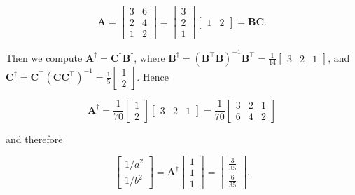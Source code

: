 \[
	\boldsymbol{A}=\left[\begin{array}{ll}
		3 & 6 \\
		2 & 4 \\
		1 & 2
	\end{array}\right]=\left[\begin{array}{l}
		3 \\
		2 \\
		1
	\end{array}\right]\left[\begin{array}{ll}
		1 & 2
	\end{array}\right]=\boldsymbol{B} \boldsymbol{C} .
\]

Then we compute \(\boldsymbol{A}^{\dagger}=\boldsymbol{C}^{\dagger} \boldsymbol{B}^{\dagger}\), where \(\boldsymbol{B}^{\dagger}=\left(\boldsymbol{B}^{\top} \boldsymbol{B}\right)^{-1} \boldsymbol{B}^{\top}=\frac{1}{14}\left[\begin{array}{lll}3 & 2 & 1\end{array}\right]\), and \(\boldsymbol{C}^{\dagger}=\boldsymbol{C}^{\top}\left(\boldsymbol{C} \boldsymbol{C}^{\top}\right)^{-1}=\frac{1}{5}\left[\begin{array}{l}1 \\ 2\end{array}\right]\). Hence

\[
	\boldsymbol{A}^{\dagger}=\frac{1}{70}\left[\begin{array}{l}
		1 \\
		2
	\end{array}\right]\left[\begin{array}{lll}
		3 & 2 & 1
	\end{array}\right]=\frac{1}{70}\left[\begin{array}{lll}
		3 & 2 & 1 \\
		6 & 4 & 2
	\end{array}\right]
\]

and therefore

\[
	\left[\begin{array}{l}
		1 / a^{2} \\
		1 / b^{2}
	\end{array}\right]=\boldsymbol{A}^{\dagger}\left[\begin{array}{l}
		1 \\
		1 \\
		1
	\end{array}\right]=\left[\begin{array}{c}
		\frac{3}{35} \\
		\frac{6}{35}
	\end{array}\right] .
\]

